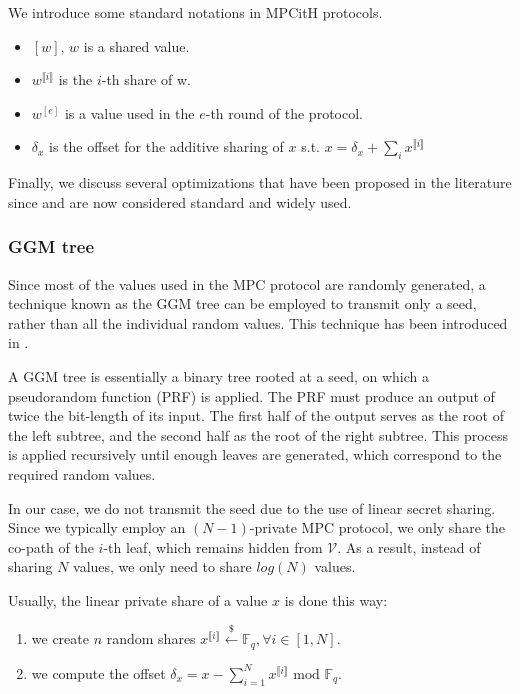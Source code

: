 \documentclass[english]{article}
\newcommand{\lir}{\llbracket i \rrbracket}
\begin{document}
		We introduce some standard notations in MPCitH protocols. 
		\begin{itemize}
			\item $[w]$, $w$ is a shared value.
			\item $w^{\lir}$ is the $i$-th share of w.
			\item $w^[e]$ is a value used in the $e$-th round of the protocol.
			\item $\delta_x$ is the offset for the additive sharing of $x$ s.t. $x = \delta_x + \sum_i x^{\lir}$
		\end{itemize}
		
		
		Finally, we discuss several optimizations that have been proposed in the literature since and are now considered standard and widely used.
		
		\subsubsection{GGM tree}
		Since most of the values used in the MPC protocol are randomly generated, a technique known as the GGM tree can be employed to transmit only a seed, rather than all the individual random values. This technique has been introduced in \cite{GGM86}.
		
		A GGM tree is essentially a binary tree rooted at a seed, on which a pseudorandom function (PRF) is applied. The PRF must produce an output of twice the bit-length of its input. The first half of the output serves as the root of the left subtree, and the second half as the root of the right subtree. This process is applied recursively until enough leaves are generated, which correspond to the required random values.
		
		In our case, we do not transmit the seed due to the use of linear secret sharing. Since we typically employ an $(N-1)$-private MPC protocol, we only share the co-path of the $i$-th leaf, which remains hidden from $\mathcal{V}$. As a result, instead of sharing $N$ values, we only need to share $log(N)$ values.
		
		Usually, the linear private share of a value $x$ is done this way:
		\begin{enumerate}
			\item we create $n$ random shares $x^{\lir} \overset{{\scriptscriptstyle\$}}\gets \mathbb{F}_q, \forall i \in [1,N]$.
			\item we compute the offset $\delta_x = x - \sum_{i=1}^{N} x^{\lir} \text{ mod } \mathbb{F}_q$.
		\end{enumerate}
		
\end{document}
